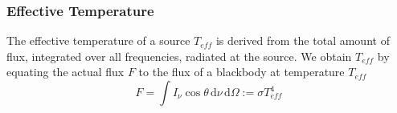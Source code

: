 \subsubsection*{Effective Temperature}
The effective temperature of a source $T_{eff}$ is derived from the total amount of flux, integrated over all frequencies, radiated at the source. We obtain $T_{eff}$ by equating the actual flux $F$ to the flux of a blackbody at temperature $T_{eff}$
\begin{equation}
    F = \int I_{\nu}\cos\theta \,\text{d}\nu\,\text{d}\Omega := \sigma T_{eff}^{4}
    \label{eq:effectivetemperature} 
\end{equation}
